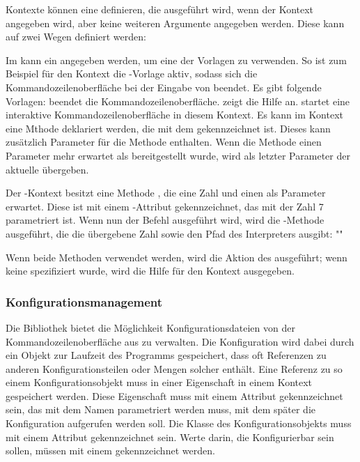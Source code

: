 Kontexte können eine  definieren, die ausgeführt wird, wenn der Kontext angegeben wird, aber keine weiteren Argumente angegeben werden.
Diese kann auf zwei Wegen definiert werden:
\begin{outline}
 \1 Im  kann ein  angegeben werden, um eine der Vorlagen zu verwenden.
 So ist zum Beispiel für den  Kontext die -Vorlage aktiv,
 sodass sich die Kommandozeilenoberfläche bei der Eingabe von  beendet.
 Es gibt folgende Vorlagen:
 \2  beendet die Kommandozeilenoberfläche.
 \2  zeigt die Hilfe an.
 \2  startet eine interaktive Kommandozeilenoberfläche in diesem Kontext.
 \1 Es kann im Kontext eine Mthode deklariert werden, die mit dem  gekennzeichnet ist.
 Dieses kann zusätzlich Parameter für die Methode enthalten.
 Wenn die Methode einen Parameter mehr erwartet als bereitgestellt wurde, wird als letzter Parameter der aktuelle  übergeben.
 
 Der -Kontext besitzt eine Methode , die eine Zahl und einen  als Parameter erwartet.
 Diese ist mit einem -Attribut gekennzeichnet, das mit der Zahl 7 parametriert ist.
 Wenn nun der Befehl  ausgeführt wird, wird die -Methode ausgeführt, die die übergebene Zahl sowie den Pfad des Interpreters ausgibt:
 ""
\end{outline}
 Wenn beide Methoden verwendet werden, wird die Aktion des  ausgeführt;
 wenn keine spezifiziert wurde, wird die Hilfe für den Kontext ausgegeben.

\subsubsection{Konfigurationsmanagement}\label{ConfigurationManagement}
Die Bibliothek bietet die Möglichkeit Konfigurationsdateien von der Kommandozeilenoberfläche aus zu verwalten.
Die Konfiguration wird dabei durch ein Objekt zur Laufzeit des Programms gespeichert, dass oft Referenzen zu anderen Konfigurationsteilen oder Mengen solcher enthält.
Eine Referenz zu so einem Konfigurationsobjekt muss in einer Eigenschaft in einem Kontext gespeichert werden.
Diese Eigenschaft muss mit einem  Attribut gekennzeichnet sein, das mit dem Namen parametriert werden muss, mit dem später die Konfiguration aufgerufen werden soll.
Die Klasse des Konfigurationsobjekts muss mit einem  Attribut gekennzeichnet sein.
Werte darin, die Konfigurierbar sein sollen, müssen mit einem  gekennzeichnet werden.

